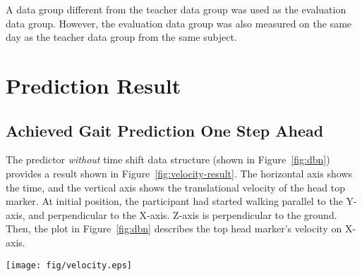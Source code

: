 \documentclass{sigchi}
\begin{document}
A data group different from the teacher data group was used as the evaluation data group. However, the evaluation data group was also measured on the same day as the teacher data group from the same subject.




\section{Prediction Result}%

\subsection {Achieved Gait Prediction One Step Ahead}

The predictor \textit{without} time shift data structure (shown in Figure~\ref{fig:dbn}) provides a result shown in Figure~\ref{fig:velocity-result}. The horizontal axis shows the time, and the vertical axis shows the translational velocity of the head top marker. At initial position, the participant had started walking parallel to the Y-axis, and perpendicular to the X-axis. Z-axis is perpendicular to the ground. Then, the plot in Figure~\ref{fig:dbn} describes the top head marker's velocity on X-axis. 

\begin{figure*} 
\centering
  \texttt{[image: fig/velocity.eps]}\hspace{-15mm} 
  \caption{$ x $ speed prediction result in the axial direction ($ \Delta t $ represents the preceding time width)}~\label{fig:velocity-result}
\end{figure*}
\end{document}
